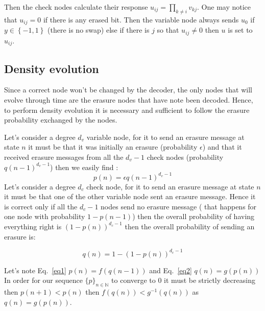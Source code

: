 \documentclass[a4paper]{article}
\begin{document}
Then the check nodes calculate their response $u_{ij}=\prod_{k \neq i}{v_{kj}}$. One may notice that $u_{ij}=0$ if there is any erased bit.
Then the variable node always sends $u_0$ if $y \in \left\{-1,1\right\}$ (there is no swap) else if there is $j$ so that $u_{ij} \neq 0$ then $u$ is set to $u_{ij}$.

\subsection{Density evolution}

Since a correct node won't be changed by the decoder, the only nodes that will evolve through time are the erasure nodes that have note been decoded. Hence, to perform density evolution it is necessary and sufficient to follow the erasure probability exchanged by the nodes.

Let's consider a degree $d_v$ variable node, for it to send an erasure message at state $n$ it must be that it was initially an erasure (probability $\epsilon$) and that it received erasure messages from all the $d_v-1$ check nodes (probability $q(n-1)^{d_v-1}$) then we easily find : 
\begin{equation}
p(n)=\epsilon q(n-1)^{d_v-1}
\label{eq1}
\end{equation}
Let's consider a degree $d_c$ check node, for it to send an erasure message at state $n$ it must be that one of the other variable node sent an erasure message. Hence it is correct only if all the $d_c-1$ nodes send no erasure message ( that happens for one node with probability $1-p(n-1)$) then the overall probability of having everything right is $(1-p(n))^{d_c-1}$ then the overall probability of sending an erasure is:

\begin{equation}
q(n)= 1-(1-p(n))^{d_c-1}
\label{eq2}
\end{equation}

Let's note Eq.~\ref{eq1} $p(n)=f(q(n-1))$ and Eq.~\ref{eq2} $q(n)=g(p(n))$ %
In order for our sequence $\{p\}_{n\in\mathbb{N}}$ to converge to 0 it must be strictly decreasing  then $p(n+1)<p(n)$ then $ f(q(n))<g^{-1}(q(n))$ as $q(n) =g(p(n))$.
\end{document}
